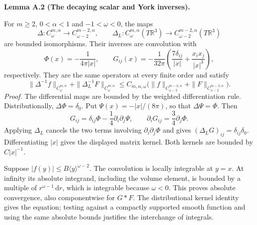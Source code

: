 \documentclass[
  english,
  11pt,
  reqno]{amsart}
\makeatletter
\newcommand{\pandocstatementheading}[1]{%
  \par\if@nobreak\else
    \addpenalty{\@beginparpenalty}%
    \addvspace{.5\baselineskip plus .2\baselineskip minus .2\baselineskip}%
  \fi
  {\normalfont\bfseries #1\par}%
  \nobreak\@afterindenttrue\@afterheading
}
\makeatother
\begin{document}
\pandocstatementheading{\leavevmode{}\label{lem:online-chart-decaying-flat-inverses}Lemma A.2 (The decaying scalar and York inverses).}

For \(m\ge2\), \(0<\alpha<1\) and \(-1<\omega<0\), the maps \[
\Delta:C^{m,\alpha}_\omega
\longrightarrow C^{m-2,\alpha}_{\omega-2},
\qquad
\Delta_L:C^{m,\alpha}_\omega(T\mathbb R^3)
\longrightarrow C^{m-2,\alpha}_{\omega-2}(T\mathbb R^3)
\] are bounded isomorphisms. Their inverses are convolution with%
 \[
\Phi(x)=-\frac1{4\pi|x|},
\qquad
G_{ij}(x)=-\frac1{32\pi}
\left(\frac{7\delta_{ij}}{|x|}
+\frac{x_ix_j}{|x|^3}\right),
\] respectively. They are the same operators at every finite order and
satisfy%
 \[
\|\Delta^{-1}f\|_{C^{m,\alpha}_\omega}
+\|\Delta_L^{-1}F\|_{C^{m,\alpha}_\omega}
\le C_{m,\alpha,\omega}
\bigl(\|f\|_{C^{m-2,\alpha}_{\omega-2}}
+\|F\|_{C^{m-2,\alpha}_{\omega-2}}\bigr).
\] \emph{Proof.} The differential maps are bounded by the weighted
differentiation rule. Distributionally, \(\Delta\Phi=\delta_0\). Put
\(\Psi(x)=-|x|/(8\pi)\), so that \(\Delta\Psi=\Phi\). Then \[
G_{ij}=\delta_{ij}\Phi-\frac14\partial_i\partial_j\Psi,
\qquad
\partial_iG_{ij}=\frac34\partial_j\Phi.
\] Applying \(\Delta_L\) cancels the two terms involving
\(\partial_i\partial_j\Phi\) and gives
\((\Delta_LG)_{ij}=\delta_{ij}\delta_0\). Differentiating \(|x|\) gives
the displayed matrix kernel. Both kernels are bounded by \(C|x|^{-1}\).

Suppose \(|f(y)|\le B\langle y\rangle^{\omega-2}\). The convolution is
locally integrable at \(y=x\). At infinity its absolute integrand,
including the volume element, is bounded by a multiple of
\(r^{\omega-1}\,\mathrm dr\), which is integrable because \(\omega<0\).
This proves absolute convergence, also componentwise for \(G*F\). The
distributional kernel identity gives the equation; testing against a
compactly supported smooth function and using the same absolute bounds
justifies the interchange of integrals.
\end{document}

